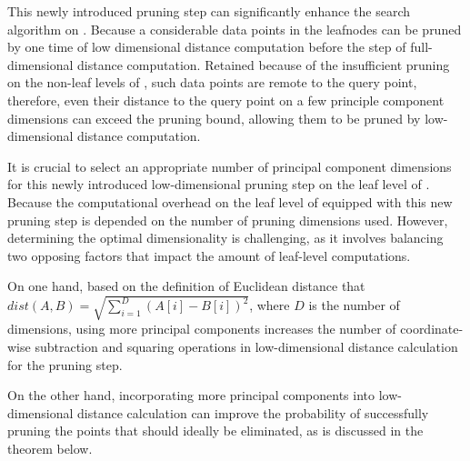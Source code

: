  This newly introduced pruning step can significantly enhance the search algorithm on \dualtree. Because a considerable data points in the leafnodes can be pruned by one time of low dimensional distance computation before the step of full-dimensional distance computation. Retained because of the insufficient pruning on the non-leaf levels of \dualtree, such data points are remote to the query point, therefore, even their distance to the query point on a few principle component dimensions can exceed the pruning bound, allowing them to be pruned by low-dimensional distance computation.





It is crucial to select an appropriate number of principal component dimensions for this newly introduced low-dimensional pruning step on the leaf level of \dualtree. Because the computational overhead on the leaf level of \dualtree equipped with this new pruning step is depended on the number of pruning dimensions used. However, determining the optimal dimensionality is challenging, as it involves balancing two opposing factors that impact the amount of leaf-level computations. 

On one hand, based on the definition of Euclidean distance that $dist(A,B) = \sqrt{\sum_{i=1}^{D}(A[i] - B[i])^2}$, where $D$ is the number of dimensions, using more principal components increases the number of coordinate-wise subtraction and squaring operations in low-dimensional distance calculation for the pruning step.

On the other hand, incorporating more principal components into low-dimensional distance calculation can improve the probability of successfully pruning the points that should ideally be eliminated, as is discussed in the theorem below.

